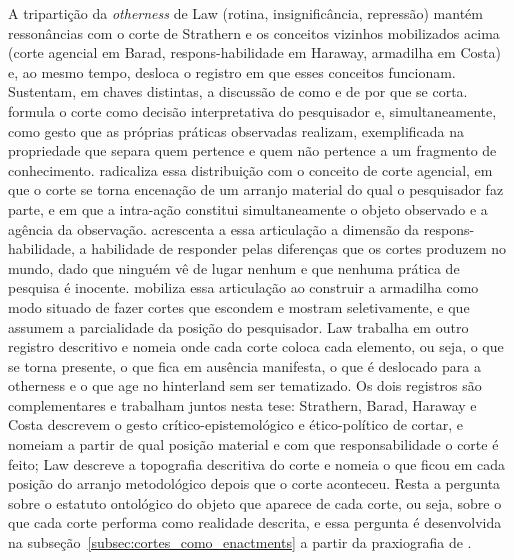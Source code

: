 A tripartição da \textit{otherness} de Law (rotina, insignificância, repressão) mantém ressonâncias com o corte de Strathern e os conceitos vizinhos mobilizados acima (corte agencial em Barad, respons-habilidade em Haraway, armadilha em Costa) e, ao mesmo tempo, desloca o registro em que esses conceitos funcionam. Sustentam, em chaves distintas, a discussão de como e de por que se corta. \textcite{strathern2011cortando} formula o corte como decisão interpretativa do pesquisador e, simultaneamente, como gesto que as próprias práticas observadas realizam, exemplificada na propriedade que separa quem pertence e quem não pertence a um fragmento de conhecimento. \textcite{Barad2007Meeting} radicaliza essa distribuição com o conceito de corte agencial, em que o corte se torna encenação de um arranjo material do qual o pesquisador faz parte, e em que a intra-ação constitui simultaneamente o objeto observado e a agência da observação. \textcite{Haraway2023Ficar} acrescenta a essa articulação a dimensão da respons-habilidade, a habilidade de responder pelas diferenças que os cortes produzem no mundo, dado que ninguém vê de lugar nenhum e que nenhuma prática de pesquisa é inocente. \textcite{costa2024manchando} mobiliza essa articulação ao construir a armadilha como modo situado de fazer cortes que escondem e mostram seletivamente, e que assumem a parcialidade da posição do pesquisador. Law trabalha em outro registro descritivo e nomeia onde cada corte coloca cada elemento, ou seja, o que se torna presente, o que fica em ausência manifesta, o que é deslocado para a otherness e o que age no hinterland sem ser tematizado. Os dois registros são complementares e trabalham juntos nesta tese: Strathern, Barad, Haraway e Costa descrevem o gesto crítico-epistemológico e ético-político de cortar, e nomeiam a partir de qual posição material e com que responsabilidade o corte é feito; Law descreve a topografia descritiva do corte e nomeia o que ficou em cada posição do arranjo metodológico depois que o corte aconteceu. Resta a pergunta sobre o estatuto ontológico do objeto que aparece de cada corte, ou seja, sobre o que cada corte performa como realidade descrita, e essa pergunta é desenvolvida na subseção~\ref{subsec:cortes_como_enactments} a partir da praxiografia de \textcite{mol2002body}.

